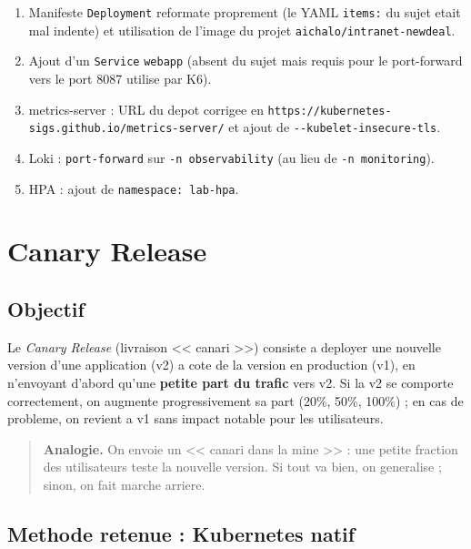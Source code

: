 \documentclass[11pt,a4paper]{report}
\begin{document}
\begin{enumerate}[nosep]
  \item Manifeste \texttt{Deployment} reformate proprement (le YAML \texttt{items:} du sujet
        etait mal indente) et utilisation de l'image du projet \texttt{aichalo/intranet-newdeal}.
  \item Ajout d'un \texttt{Service} \texttt{webapp} (absent du sujet mais requis pour le
        port-forward vers le port 8087 utilise par K6).
  \item metrics-server : URL du depot corrigee en
        \texttt{https://kubernetes-sigs.github.io/metrics-server/} et ajout de
        \texttt{-{}-kubelet-insecure-tls}.
  \item Loki : \texttt{port-forward} sur \texttt{-n observability} (au lieu de
        \texttt{-n monitoring}).
  \item HPA : ajout de \texttt{namespace: lab-hpa}.
\end{enumerate}

\chapter{Canary Release}

\section{Objectif}

Le \emph{Canary Release} (livraison << canari >>) consiste a deployer une nouvelle version
d'une application (v2) a cote de la version en production (v1), en n'envoyant d'abord
qu'une \textbf{petite part du trafic} vers v2. Si la v2 se comporte correctement, on
augmente progressivement sa part (20\%, 50\%, 100\%) ; en cas de probleme, on revient a
v1 sans impact notable pour les utilisateurs.

\begin{quote}
\textbf{Analogie.} On envoie un << canari dans la mine >> : une petite fraction des
utilisateurs teste la nouvelle version. Si tout va bien, on generalise ; sinon, on fait
marche arriere.
\end{quote}

\section{Methode retenue : Kubernetes natif}
\end{document}
